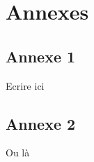 \documentclass[twoside,11pt,openany,a4paper]{rapport}
\begin{document}



\backmatter

\appendix
\part{Annexes}
\chapter{Annexe 1}
Ecrire ici

\chapter{Annexe 2}
Ou là
\end{document}
